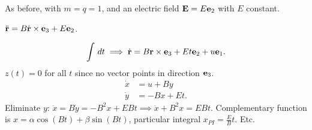 \documentclass[10pt, a4paper]{article}
\begin{document}
\begin{example}
    As before,
    with $m = q = 1$,
    and an electric field $\mathbf{E} = E\mathbf{e}_2$ with $E$ constant.

    \begin{solution}
        $\ddot{\mathbf{r}} = B\dot{\mathbf{r}} \times \mathbf{e}_3 + E\mathbf{e}_2$.

        \[
        \int\,dt \implies \dot{\mathbf{r}} = B\mathbf{r} \times \mathbf{e}_3 + Et\mathbf{e}_2 + u\mathbf{e}_1.
        \]
        $z(t) = 0$ for all $t$ since no vector points in direction $\mathbf{e}_3$.
        \begin{align*}
            \dot{x} &= u + By \\
            \dot{y} &= -Bx + Et.
        \end{align*}
        Eliminate $y$:
        $\ddot{x} = B\dot{y} = -B ^ 2x + EBt \implies \ddot{x} + B ^ 2x = EBt$.
        Complementary function is $x = \alpha\cos(Bt) + \beta\sin(Bt)$,
        particular integral $x_{PI} = \frac{E}{B}t$.
        Etc.
        
    \end{solution}
\end{example}
\end{document}
